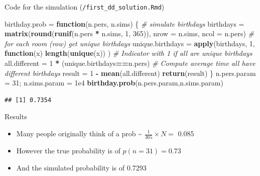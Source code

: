 \documentclass[ignorenonframetext,]{beamer}
\newenvironment{Shaded}{\begin{snugshade}}{\end{snugshade}}
\newcommand{\CommentTok}[1]{\textcolor[rgb]{0.56,0.35,0.01}{\textit{#1}}}
\newcommand{\ControlFlowTok}[1]{\textcolor[rgb]{0.13,0.29,0.53}{\textbf{#1}}}
\newcommand{\DataTypeTok}[1]{\textcolor[rgb]{0.13,0.29,0.53}{#1}}
\newcommand{\DecValTok}[1]{\textcolor[rgb]{0.00,0.00,0.81}{#1}}
\newcommand{\FloatTok}[1]{\textcolor[rgb]{0.00,0.00,0.81}{#1}}
\newcommand{\KeywordTok}[1]{\textcolor[rgb]{0.13,0.29,0.53}{\textbf{#1}}}
\newcommand{\NormalTok}[1]{#1}
\newcommand{\OperatorTok}[1]{\textcolor[rgb]{0.81,0.36,0.00}{\textbf{#1}}}
\newcommand{\StringTok}[1]{\textcolor[rgb]{0.31,0.60,0.02}{#1}}
\providecommand{\tightlist}{%
  \setlength{\itemsep}{0pt}\setlength{\parskip}{0pt}}
\begin{document}
\begin{frame}[fragile]{Code for the simulation
(\texttt{/first\_dd\_solution.Rmd})}
\protect\hypertarget{code-for-the-simulation-first_dd_solution.rmd}{}

\begin{Shaded}
\begin{Highlighting}[]
\NormalTok{birthday.prob =}\StringTok{ }\ControlFlowTok{function}\NormalTok{(n.pers, n.sims) \{}
  \CommentTok{# simulate birthdays}
\NormalTok{  birthdays =}\StringTok{ }\KeywordTok{matrix}\NormalTok{(}\KeywordTok{round}\NormalTok{(}\KeywordTok{runif}\NormalTok{(n.pers }\OperatorTok{*}\StringTok{ }\NormalTok{n.sims, }
                                 \DecValTok{1}\NormalTok{, }\DecValTok{365}\NormalTok{)), }
                      \DataTypeTok{nrow =}\NormalTok{ n.sims, }\DataTypeTok{ncol =}\NormalTok{ n.pers)}
  \CommentTok{# for each room (row) get unique birthdays}
\NormalTok{  unique.birthdays =}\StringTok{ }\KeywordTok{apply}\NormalTok{(birthdays, }\DecValTok{1}\NormalTok{, }
                           \ControlFlowTok{function}\NormalTok{(x) }
                             \KeywordTok{length}\NormalTok{(}\KeywordTok{unique}\NormalTok{(x)) )}
  \CommentTok{# Indicator with 1 if all are unique birthdays}
\NormalTok{  all.different =}\StringTok{ }\DecValTok{1} \OperatorTok{*}\StringTok{ }\NormalTok{(unique.birthdays}\OperatorTok{==}\NormalTok{n.pers)}
  \CommentTok{# Compute average time all have different birthdays }
\NormalTok{  result =}\StringTok{ }\DecValTok{1} \OperatorTok{-}\StringTok{ }\KeywordTok{mean}\NormalTok{(all.different)}
\KeywordTok{return}\NormalTok{(result)}
\NormalTok{\}}
\NormalTok{n.pers.param =}\StringTok{ }\DecValTok{31}\NormalTok{; n.sims.param =}\StringTok{ }\FloatTok{1e4}
\KeywordTok{birthday.prob}\NormalTok{(n.pers.param,n.sims.param)}
\end{Highlighting}
\end{Shaded}

\begin{verbatim}
## [1] 0.7354
\end{verbatim}

\end{frame}

\begin{frame}{Results}
\protect\hypertarget{results}{}

\begin{itemize}
\tightlist
\item
  Many people originally think of a prob \textasciitilde{}
  \(\frac{1}{365} \times N =\) 0.085
\item
  However the true probability is of \(p(n= 31) = 0.73\)
\item
  And the simulated probability is of 0.7293
\end{itemize}

\end{frame}
\end{document}
